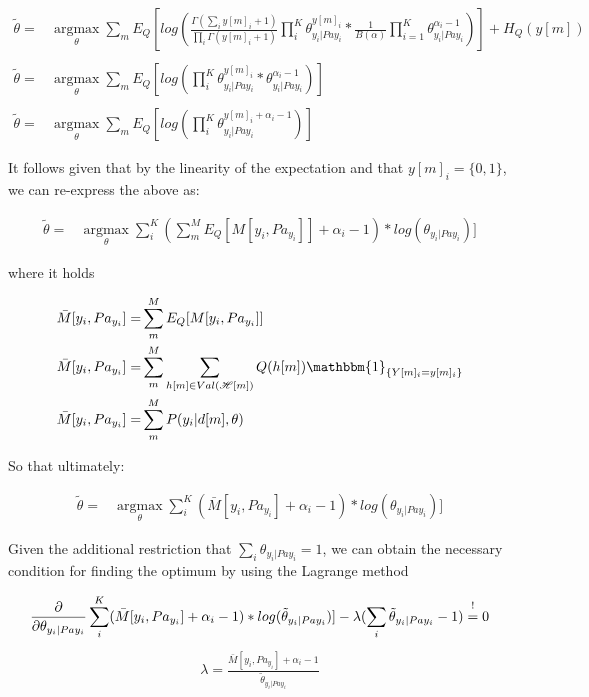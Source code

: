 \documentclass[11pt]{article}
\begin{document}
\begin{align} \label{eq:first-order-condition}
\tilde{\theta} =& \operatorname*{argmax}_{\theta} \sum_m E_Q[log(\frac{\Gamma(\sum_i y[m]_i + 1)}{\prod_i \Gamma(y[m]_i + 1)} \prod_i^K \theta_{y_i | Pa{y_i}}^{y[m]_i} * \frac{1}{B(\alpha)} \prod_{i=1}^K \theta_{y_i | Pa{y_i}}^{\alpha_i - 1})] + H_Q (y[m]) \\
\nonumber\\   
\tilde{\theta} =& \operatorname*{argmax}_{\theta} \sum_m E_Q[log(\prod_i^K \theta_{y_i | Pa{y_i}}^{y[m]_i} * \theta_{y_i | Pa{y_i}}^{\alpha_i - 1})]\\
\nonumber\\   
\tilde{\theta} =& \operatorname*{argmax}_{\theta} \sum_m E_Q[log(\prod_i^K \theta_{y_i | Pa{y_i}}^{y[m]_i + \alpha_i - 1})] 
\end{align}

It follows given that by the linearity of the expectation and that
\(y[m]_i = \{0,1\}\), we can re-express the above as:

\begin{align} \label{eq:solution1}
\tilde{\theta} =& \operatorname*{argmax}_{\theta} \sum_i^K (\sum_m^M E_Q[M[y_i, Pa_{y_i}]] + \alpha_i - 1) * log(\theta_{y_i | Pa{y_i}})] 
\end{align}

where it holds

\begin{align} \label{eq:expected_sufficient}
\bar{M}[y_i, Pa_{y_i}]  =& \sum_m^M E_Q[M[y_i, Pa_{y_i}]]\\
\bar{M}[y_i, Pa_{y_i}]  =& \sum_m^M \sum_{h[m] \in Val(\mathscr{H}[m])} Q(h[m]) \mathbbm{1}_{\{Y[m]_i = y[m]_i\}}\\
\bar{M}[y_i, Pa_{y_i}]  =& \sum_m^M P(y_i | d[m], \theta)
\end{align}

So that ultimately:

\begin{align} \label{eq:solution2}
\tilde{\theta} =& \operatorname*{argmax}_{\theta} \sum_i^K (\bar{M}[y_i, Pa_{y_i}] + \alpha_i - 1) * log(\theta_{y_i | Pa{y_i}})] 
\end{align}

Given the additional restriction that \(\sum_i \theta_{y_i |
    Pa{y_i}} = 1\), we can obtain the necessary condition for finding
the optimum by using the Lagrange method

\begin{align} \label{eq:first-order1}
\frac{\partial}{\partial \theta_{y_i | Pa{y_i}}} \sum_i^K (\bar{M}[y_i, Pa_{y_i}] + \alpha_i - 1) * log(\tilde{\theta}_{y_i | Pa{y_i}})] - \lambda (\sum_i \tilde{\theta}_{y_i | Pa{y_i}} - 1) \mathrel{\stackon[5pt]{$=$}{$\scriptstyle!$}} 0
\end{align}
\begin{align} \label{eq:first-order2}
\lambda = \frac{\bar{M}[y_i, Pa_{y_i}] + \alpha_i - 1}{\tilde{\theta}_{y_i | Pa{y_i}}}
\end{align}
\end{document}
